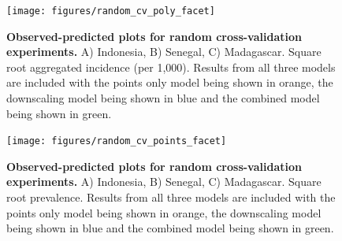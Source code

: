 \documentclass[10pt,letterpaper]{article}
\begin{document}
\begin{figure}
\texttt{[image: figures/random\_cv\_poly\_facet]} %
\caption{{\bf Observed-predicted plots for random cross-validation experiments.}
A) Indonesia, B) Senegal, C) Madagascar. Square root aggregated incidence (per 1,000).
Results from all three models are included with the points only model being shown in orange, the downscaling model being shown in blue and the combined model being shown in green.
}
\label{randompredobspolyfacet}
\end{figure}

\begin{figure}
\texttt{[image: figures/random\_cv\_points\_facet]} %
\caption{{\bf Observed-predicted plots for random cross-validation experiments.}
A) Indonesia, B) Senegal, C) Madagascar. Square root prevalence.
Results from all three models are included with the points only model being shown in orange, the downscaling model being shown in blue and the combined model being shown in green.
}
\label{randompredobspointfacet}
\end{figure}
\end{document}
